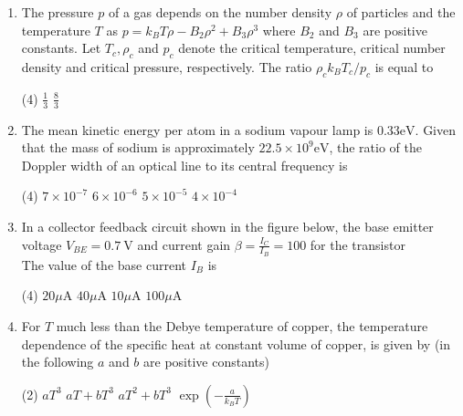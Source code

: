 \begin{enumerate}
 \begin{tasks}(4)
	\task[\textbf{a.}]$\left(\frac{E t^{2}}{\rho}\right)^{1 / 5}$
	\task[\textbf{b.}]$\left(\frac{\rho}{E t^{2}}\right)^{1 / 5}$
	\task[\textbf{c.}]$\frac{E t^{2}}{\rho}$
	\task[\textbf{d.}] $E \rho t^{2}$
\end{tasks}
\item The pressure $p$ of a gas depends on the number density $\rho$ of particles and the temperature $T$ as $p=k_{B} T \rho-B_{2} \rho^{2}+B_{3} \rho^{3}$ where $B_{2}$ and $B_{3}$ are positive constants. Let $T_{c}, \rho_{c}$ and $p_{c}$ denote the critical temperature, critical number density and critical pressure, respectively. The ratio $\rho_{c} k_{B} T_{c} / p_{c}$ is equal to
 \begin{tasks}(4)
	\task[\textbf{a.}]$\frac{1}{3}$
	\task[\textbf{c.}]$\frac{8}{3}$
\end{tasks}
\item The mean kinetic energy per atom in a sodium vapour lamp is $0.33 \mathrm{eV}$. Given that the mass of sodium is approximately $22.5 \times 10^{9} \mathrm{eV}$, the ratio of the Doppler width of an optical line to its central frequency is
 \begin{tasks}(4)
	\task[\textbf{a.}]$7 \times 10^{-7}$
	\task[\textbf{b.}]$6 \times 10^{-6}$
	\task[\textbf{c.}]$5 \times 10^{-5}$
	\task[\textbf{d.}]$4 \times 10^{-4}$ 
\end{tasks}
\item  In a collector feedback circuit shown in the figure below, the base emitter voltage $V_{B E}=0.7 \mathrm{~V}$ and current gain $\beta=\frac{I_{C}}{I_{B}}=100$ for the transistor\\
The value of the base current $I_{B}$ is
 \begin{tasks}(4)
	\task[\textbf{a.}]$20 \mu \mathrm{A}$
	\task[\textbf{b.}]$40 \mu \mathrm{A}$
	\task[\textbf{c.}]$10 \mu \mathrm{A}$
	\task[\textbf{d.}]$100 \mu \mathrm{A}$ 
\end{tasks}
\item For $T$ much less than the Debye temperature of copper, the temperature dependence of the specific heat at constant volume of copper, is given by (in the following $a$ and $b$ are positive constants)
 \begin{tasks}(2)
	\task[\textbf{a.}]$a T^{3}$
	\task[\textbf{b.}]$a T+b T^{3}$
	\task[\textbf{c.}] $a T^{2}+b T^{3}$
	\task[\textbf{d.}] $\exp \left(-\frac{a}{k_{B} T}\right)$
\end{tasks}





\end{enumerate}